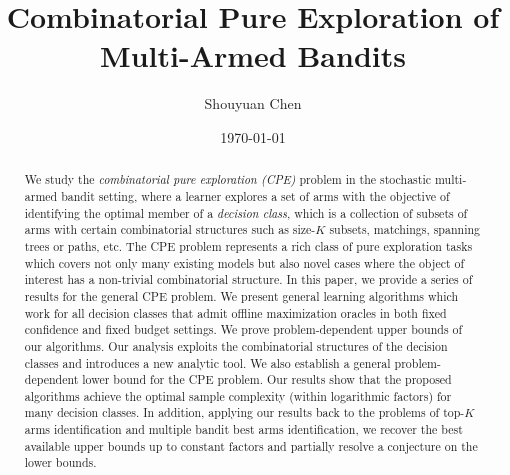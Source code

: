 \documentclass{article}
\title{Combinatorial Pure Exploration of \\ Multi-Armed Bandits}
\author{Shouyuan Chen}
\date{\today}
\newcommand{\wei}[1]{}
\newcommand{\wei}[1]{{\color{blue!50!black}  [\text{Wei:} #1]}}
\newcommand{\Problem}{{CPE}\xspace}
\begin{document}
\newpage

\maketitle
\vspace{-1em}
\begin{abstract}
We study the {\em combinatorial pure exploration (\Problem)} problem in the stochastic multi-armed bandit setting,
	where a learner explores a set of arms with the objective of identifying the optimal member
	of a \emph{decision class}, which is a collection of subsets of arms with certain combinatorial structures 
	such as size-$K$ subsets, matchings, spanning trees or paths, etc.
The \Problem problem represents a rich class of pure exploration tasks which covers not only many existing models but also novel cases where the object of interest has a non-trivial combinatorial structure.
In this paper, we provide a series of results for the general \Problem problem.
We present general learning algorithms which work for all decision classes that admit offline maximization oracles in both fixed confidence and fixed budget settings. 
We prove problem-dependent upper bounds of our algorithms. 
Our analysis exploits the combinatorial structures of the decision classes and introduces a new analytic tool.
We also establish a general problem-dependent lower bound for the \Problem problem.
Our results show that the proposed algorithms achieve the optimal sample complexity (within logarithmic factors) for many decision classes. 
In addition, applying our results back to the problems of top-$K$ arms identification and multiple bandit best arms identification, we recover the best available upper bounds up to constant factors and 
partially resolve a conjecture on the lower bounds.





\end{abstract}
\end{document}
